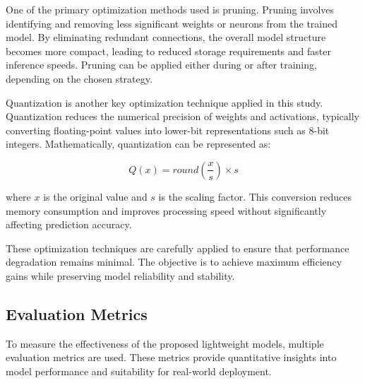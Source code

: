 \documentclass[conference]{IEEEtran}
\begin{document}
One of the primary optimization methods used is pruning. Pruning involves identifying and removing less significant weights or neurons from the trained model. By eliminating redundant connections, the overall model structure becomes more compact, leading to reduced storage requirements and faster inference speeds. Pruning can be applied either during or after training, depending on the chosen strategy.

Quantization is another key optimization technique applied in this study. Quantization reduces the numerical precision of weights and activations, typically converting floating-point values into lower-bit representations such as 8-bit integers. 
Mathematically, quantization can be represented as:

\begin{equation}
Q(x) = round\left(\frac{x}{s}\right) \times s
\end{equation}

where $x$ is the original value and $s$ is the scaling factor.
This conversion reduces memory consumption and improves processing speed without significantly affecting prediction accuracy.

These optimization techniques are carefully applied to ensure that performance degradation remains minimal. The objective is to achieve maximum efficiency gains while preserving model reliability and stability.

\subsection{Evaluation Metrics}

To measure the effectiveness of the proposed lightweight models, multiple evaluation metrics are used. These metrics provide quantitative insights into model performance and suitability for real-world deployment.
\end{document}
